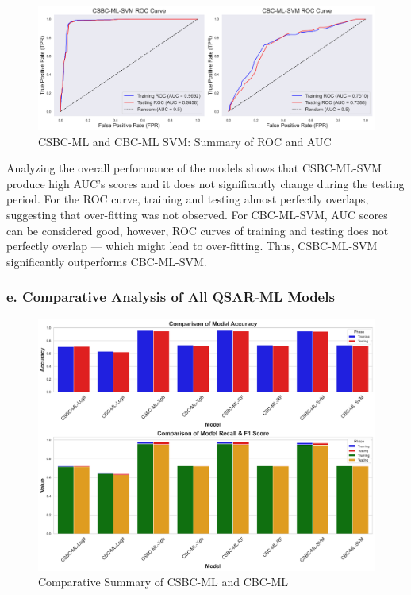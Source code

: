 \FloatBarrier
\begin{figure}[h] %
    \centering
    \includegraphics[scale=0.4]{combined_roc_svm.png} %
    \caption{CSBC-ML and CBC-ML SVM: Summary of ROC and AUC }
    \label{fig:roc_svm} %
\end{figure}
\FloatBarrier

Analyzing the overall performance of the models shows that CSBC-ML-SVM produce high AUC's scores and it does not significantly change during the testing period. For the ROC curve, training and testing almost perfectly overlaps, suggesting that over-fitting was not observed. For CBC-ML-SVM, AUC scores can be considered good, however, ROC curves of training and testing does not perfectly overlap --- which might lead to over-fitting. Thus, CSBC-ML-SVM significantly outperforms CBC-ML-SVM.

\subsubsection*{e. Comparative Analysis of All QSAR-ML Models}

\begin{figure}[h] %
    \centering
    \includegraphics[scale=0.4]{model_comparison_collage.png} %
    \caption{Comparative Summary of CSBC-ML and CBC-ML}
    \label{fig:model_comparison} %
\end{figure}

